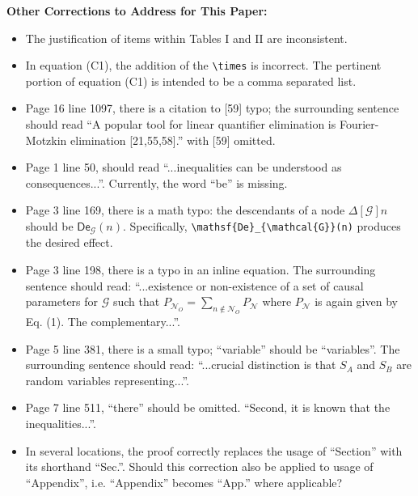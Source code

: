 \documentclass{article}
\begin{document}
    \textbf{Other Corrections to Address for This Paper:}
    \begin{itemize}
        \item The justification of items within Tables I and II are inconsistent.
        \item In equation (C1), the addition of the \verb|\times| is incorrect. The pertinent portion of equation (C1) is intended to be a comma separated list.
        \item Page 16 line 1097, there is a citation to [59] typo; the surrounding sentence should read ``A popular tool for linear quantifier elimination is Fourier-Motzkin elimination [21,55,58].'' with [59] omitted.
        \item Page 1 line 50, should read ``...inequalities can be understood as consequences...''. Currently, the word ``be'' is missing.
        \item Page 3 line 169, there is a math typo: the descendants of a node $\Delta[\mathcal{G}]n$ should be $\mathsf{De}_{\mathcal{G}}(n)$. Specifically, \verb|\mathsf{De}_{\mathcal{G}}(n)| produces the desired effect.
        \item Page 3 line 198, there is a typo in an inline equation. The surrounding sentence should read: ``...existence or non-existence of a set of causal parameters for $\mathcal G$ such that $P_{\mathcal{N}_{O}} = \sum_{n \not \in \mathcal{N}_{O}} P_{\mathcal{N}}$ where $P_{\mathcal{N}}$ is again given by Eq. (1). The complementary...''.
        \item Page 5 line 381, there is a small typo; ``variable'' should be ``variables''. The surrounding sentence should read: ``...crucial distinction is that $S_{A}$ and $S_{B}$ are random variables representing...''.
        \item Page 7 line 511, ``there'' should be omitted. ``Second, it is known that the inequalities...''.
        \item In several locations, the proof correctly replaces the usage of ``Section'' with its shorthand ``Sec.''. Should this correction also be applied to usage of ``Appendix'', i.e. ``Appendix'' becomes ``App.'' where applicable?
    \end{itemize}
\end{document}
